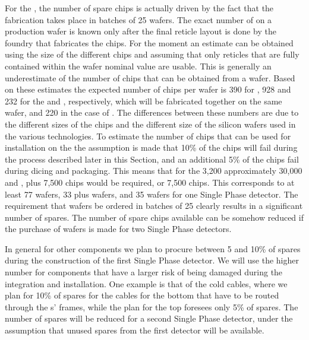 For the , the number of
spare chips is actually driven by the fact that the fabrication
takes place in batches of 25 wafers. The exact number of  
on a production wafer is known only after the final reticle layout
is done by the foundry that fabricates the chips. For the moment
an estimate can be obtained using the size of the different 
chips and assuming that only reticles that are fully contained
within the wafer nominal value are usable. This is generally
an underestimate of the number of chips that can be obtained 
from a wafer. Based on these estimates the expected number
of chips per wafer is 390 for , 928 and 232 for the 
and , respectively, which will be fabricated together on the same wafer,
and 220 in the case of . The differences between these
numbers are due to the different sizes of the chips and the
different size of the silicon wafers used in the various 
technologies. To estimate the number of chips that can be
used for installation on the  the assumption is
made that 10\% of the chips will fail during the 
process described later in this Section, and an additional
5\% of the chips fail during dicing and packaging. This means
that for the 3,200  approximately 30,000  and
, plus 7,500  chips would be required, or 7,500
 chips. This corresponds to at least 77  wafers,
33  plus  wafers, and 35  wafers for one
Single Phase detector. The requirement that wafers be ordered
in batches of 25 clearly results in a significant number of
spares. The number of spare chips available can be somehow
reduced if the purchase of wafers is made for two Single
Phase detectors. 

In general for other components we plan to procure between 5 and
10\% of spares during the construction of the first Single Phase
detector. We will use the higher number for components that have
a larger risk of being damaged during the integration and 
installation. One example is that of the cold cables, where we
plan for 10\% of spares for the cables for the bottom 
that have to be routed through the s' frames, while
the plan for the top  foresees only 5\% of spares.
The number of spares will be reduced for a second Single Phase
detector, under the assumption that unused spares from the first
detector will be available.


